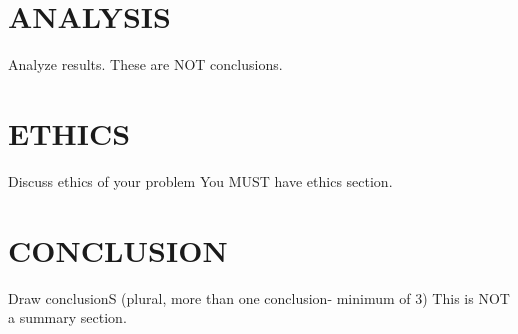 \documentclass[]{llncs}
\begin{document}
\section{ANALYSIS}
Analyze results.
These are NOT conclusions.
\section{ETHICS}
Discuss ethics of your problem
You MUST have ethics section.
\section{CONCLUSION}
Draw conclusionS (plural, more than one conclusion- minimum of 3)
This is NOT a summary section.


\end{document}
